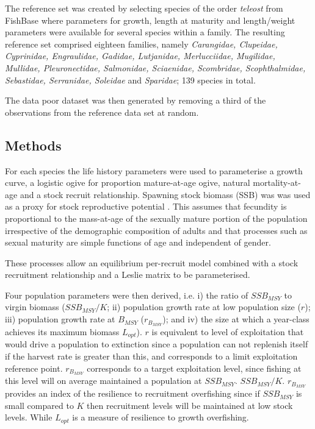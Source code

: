 \documentclass[12pt,doublespacing,a4paper]{ouparticle}
\begin{document}
The reference set was created by selecting species of the order \textit{teleost} from FishBase %
where parameters for growth, length at maturity and length/weight parameters were available for several species within a family. The resulting reference set comprised eighteen families, namely \textit{Carangidae, Clupeidae,  Cyprinidae, Engraulidae, Gadidae, Lutjanidae, Merlucciidae, Mugilidae, Mullidae, Pleuronectidae, Salmonidae, Sciaenidae, Scombridae, Scophthalmidae, Sebastidae, Serranidae, Soleidae} and \textit{Sparidae}; 139 species in total.

The data poor dataset was then generated by removing a third of the observations from the reference data set at random. 

\subsection{Methods}

For each species the life history parameters were used to parameterise a \cite{vonbert1957quantitative} growth curve, a logistic ogive for proportion mature-at-age ogive, natural mortality-at-age \citep{lorenzen2002density} and a \cite{beverton1993dynamics} stock recruit relationship. Spawning stock biomass (SSB) was was used as a proxy for stock reproductive potential \citep[SRP][]{trippel_estimation_1999,Trippel 1999,tomkiewicz2003avaliable}. This assumes that fecundity is proportional to the mass-at-age of the sexually mature portion of the population irrespective of the demographic composition of adults \citep{murawski_impacts_2001} and that processes such as sexual maturity are simple functions of age \citep{matsuda_inconsistency_1996} and independent of gender.

These processes allow an equilibrium per-recruit model combined with a stock recruitment relationship \cite{sissenwine1987alternative} and a Leslie matrix \citep{caswell1989matrix} to be parameterised.

Four population parameters were then derived, i.e. i) the ratio of $SSB_{MSY}$ to virgin biomass ($SSB_{MSY}/K$; ii) population growth rate at low population size ($r$); iii) population growth rate at $B_{MSY}$ ($r_{B_{MSY}}$); and iv) the size at which a year-class achieves its maximum biomass $L_{opt}$). $r$ is equivalent to level of exploitation that would drive a population to extinction since a population can not replenish itself if the harvest rate is greater than this, and corresponds to a limit exploitation reference point. $r_{B_{MSY}}$ corresponds to a target exploitation level, since fishing at this level will on average maintained a population at $SSB_{MSY}$. $SSB_{MSY}/K$. $r_{B_{MSY}}$ provides an index of the resilience to recruitment overfishing since if $SSB_{MSY}$ is small compared to $K$ then recruitment levels will be maintained at low stock levels. While $L_{opt}$ is a measure of resilience to growth overfishing.
\end{document}
